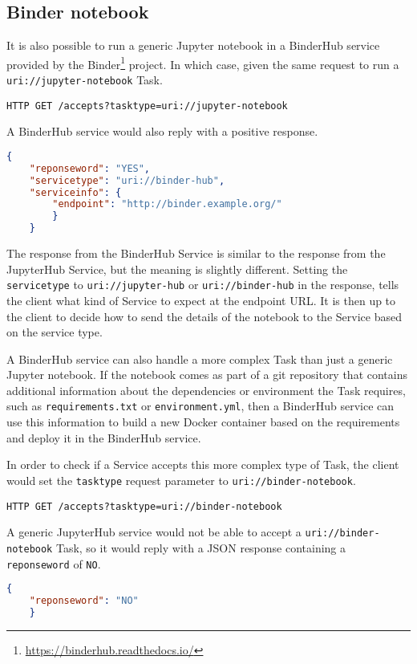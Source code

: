 \documentclass[11pt,a4paper]{ivoa}
\newcommand{\json} {JSON\xspace}
\newcommand{\docker} {Docker\xspace}
\newcommand{\binderhub} {BinderHub\xspace}
\newcommand{\jupyter} {Jupyter\xspace}
\newcommand{\jupyterhub} {JupyterHub\xspace}
\newcommand{\codeword}[1] {\texttt{#1}}
\newcommand{\footurl}[1] {\footnote{\url{#1}}}
\begin{document}
\subsection{Binder notebook}
\label{sec:uri://binder-notebook}
It is also possible to run a generic \jupyter notebook in a \binderhub service provided by the Binder\footurl{https://binderhub.readthedocs.io/} project.
In which case, given the same request to run a \codeword{uri://jupyter-notebook} Task.
\begin{lstlisting}[]
    HTTP GET /accepts?tasktype=uri://jupyter-notebook
\end{lstlisting}
A \binderhub service would also reply with a positive response.
\begin{lstlisting}[language=json]
    {
    "reponseword": "YES",
    "servicetype": "uri://binder-hub",
    "serviceinfo": {
        "endpoint": "http://binder.example.org/"
        }
    }
\end{lstlisting}
The response from the \binderhub Service is similar to the response from the \jupyterhub Service, but the meaning is slightly different. Setting the \codeword{servicetype} to \codeword{uri://jupyter-hub} or \codeword{uri://binder-hub} in the response, tells the client what kind of Service to expect at the endpoint URL. It is then up to the client to decide how to send the details of the notebook to the Service based on the service type.

A \binderhub service can also handle a more complex Task than just a generic \jupyter notebook. If the notebook comes as part of a git repository that contains additional information about the dependencies or environment the Task requires, such as \codeword{requirements.txt} or \codeword{environment.yml}, then a \binderhub service can use this information to build a new \docker container based on the requirements and deploy it in the \binderhub service.

In order to check if a Service accepts this more complex type of Task, the client would set the \codeword{tasktype} request parameter to \codeword{uri://binder-notebook}.
\begin{lstlisting}[]
    HTTP GET /accepts?tasktype=uri://binder-notebook
\end{lstlisting}

A generic \jupyterhub service would not be able to accept a \codeword{uri://binder-notebook} Task, so it would reply with a \json response containing a \codeword{reponseword} of \codeword{NO}.

\begin{lstlisting}[language=json]
    {
    "reponseword": "NO"
    }
\end{lstlisting}
\end{document}
